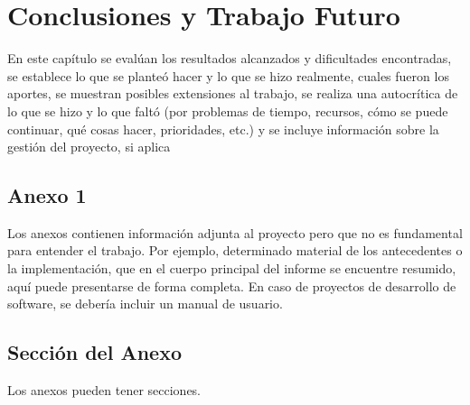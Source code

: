 \documentclass{prgrado}
\begin{document}

\chapter{Conclusiones y Trabajo Futuro}

En este capítulo se evalúan los resultados alcanzados y
dificultades encontradas, se establece lo que se planteó hacer y lo que se hizo
realmente, cuales fueron los aportes, se muestran posibles extensiones al trabajo, se
realiza una autocrítica de lo que se hizo y lo que faltó (por problemas de tiempo,
recursos, cómo se puede continuar, qué cosas hacer, prioridades, etc.) y se incluye
información sobre la gestión del proyecto, si aplica



{ %

\backmatter %


\newpage



} 



\begin{appendix}

\chapter{Anexo 1}

Los anexos contienen información adjunta al proyecto pero que no es fundamental
para entender el trabajo. Por ejemplo, determinado material de los antecedentes o la
implementación, que en el cuerpo principal del informe se encuentre resumido, aquí
puede presentarse de forma completa. En caso de proyectos de desarrollo de
software, se debería incluir un manual de usuario.

\section{Sección del Anexo}

Los anexos pueden tener secciones.

\end{appendix}


\end{document}
